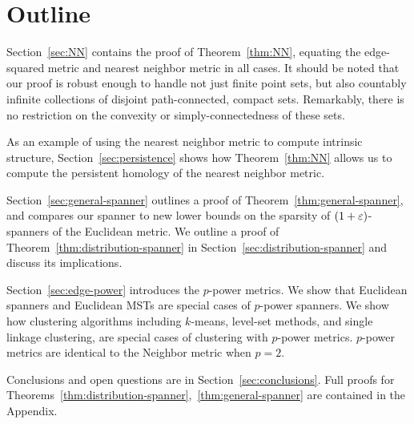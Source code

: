 \section{Outline}
%
Section~\ref{sec:NN} contains the proof of Theorem~\ref{thm:NN},
equating the edge-squared metric and nearest neighbor metric in
all cases. It should be noted that our proof is robust enough to handle not
just finite point sets, but also countably infinite collections of disjoint
path-connected, compact sets. Remarkably, there is no restriction on the convexity or
simply-connectedness of these sets.

As an example of using the nearest neighbor metric to compute intrinsic structure, Section~\ref{sec:persistence} shows how Theorem~\ref{thm:NN} allows us to compute the persistent homology of the nearest neighbor metric.

Section~\ref{sec:general-spanner} outlines a proof of Theorem~\ref{thm:general-spanner}, and compares our spanner to new lower
bounds
on the sparsity of $(1+\varepsilon)$-spanners of the Euclidean metric.
We outline a proof of Theorem~\ref{thm:distribution-spanner} in
Section~\ref{sec:distribution-spanner} and discuss its implications.

Section~\ref{sec:edge-power} introduces the $p$-power metrics. We show
that Euclidean spanners and Euclidean MSTs are special cases of
$p$-power spanners. We show how
clustering algorithms including $k$-means, level-set methods,
and single linkage clustering, are special cases of
clustering with $p$-power metrics. $p$-power metrics are identical to the
Neighbor metric when $p=2$.


Conclusions and open questions are in
Section~\ref{sec:conclusions}. Full proofs for
Theorems~\ref{thm:distribution-spanner},~\ref{thm:general-spanner}
are contained in the Appendix.
